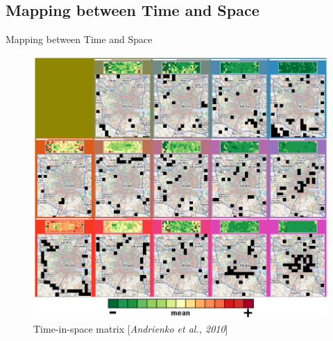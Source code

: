 \documentclass[10pt]{beamer}
\begin{document}
\subsection{Mapping between Time and Space}


\begin{frame}{Mapping between Time and Space}
	\centering
	\begin{minipage}[t]{0.475\textwidth}
		\begin{figure}[htbp]
			\includegraphics[width=\textwidth]{images/SOM_SiT}
			\caption{Time-in-space matrix [\textit{Andrienko et al., 2010}]}
		\end{figure}
	\end{minipage}
	\hfill
	\begin{minipage}[t]{0.475\textwidth}
		\begin{figure}[htbp]

\end{figure}
\end{minipage}
\end{frame}
\end{document}

